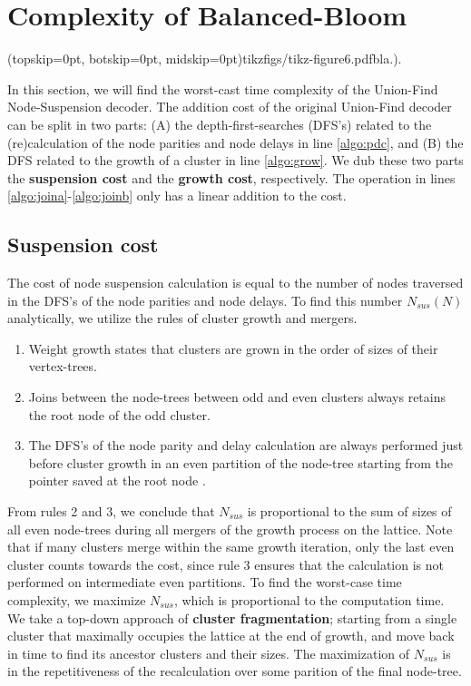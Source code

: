 
\section{Complexity of Balanced-Bloom}\label{sec:complexity}

\Figure[htb](topskip=0pt, botskip=0pt, midskip=0pt){tikzfigs/tikz-figure6.pdf}{bla.).\label{fig6}}

In this section, we will find the worst-cast time complexity of the Union-Find Node-Suspension decoder. The addition cost of the original Union-Find decoder can be split in two parts: (A) the depth-first-searches (DFS's) related to the (re)calculation of the node parities and node delays in line \ref{algo:pdc}, and (B) the DFS related to the growth of a cluster in line \ref{algo:grow}. We dub these two parts the \textbf{suspension cost} and the \textbf{growth cost}, respectively. The  operation in lines \ref{algo:joina}-\ref{algo:joinb} only has a linear addition to the cost.

\subsection{Suspension cost}\label{sec:suscomplexity}

The cost of node suspension calculation is equal to the number of nodes traversed in the DFS's of the node parities and node delays. To find this number $N_{sus}(N)$ analytically, we utilize the rules of cluster growth and mergers.

\begin{enumerate}
  \item Weight growth states that clusters are grown in the order of sizes of their vertex-trees. 
  \item Joins between the node-trees between odd and even clusters always retains the root node of the odd cluster.
  \item The DFS's of the node parity and delay calculation are always performed just before cluster growth in an even partition of the node-tree starting from the pointer saved at the root node .
\end{enumerate}
From rules 2 and 3, we conclude that $N_{sus}$ is proportional to the sum of sizes of all even node-trees during all mergers of the growth process on the lattice. Note that if many clusters merge within the same growth iteration, only the last even cluster counts towards the cost, since rule 3 ensures that the calculation is not performed on intermediate even partitions. To find the worst-case time complexity, we maximize $N_{sus}$, which is proportional to the computation time. We take a top-down approach of \textbf{cluster fragmentation}; starting from a single cluster that maximally occupies the lattice at the end of growth, and move back in time to find its ancestor clusters and their sizes. The maximization of $N_{sus}$ is in the repetitiveness of the recalculation over some parition of the final node-tree. 

